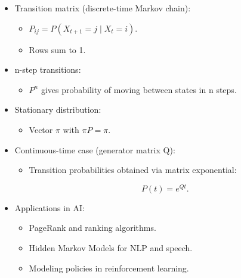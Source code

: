 \documentclass[
  letterpaper,
  DIV=11,
  numbers=noendperiod]{scrreprt}
\providecommand{\tightlist}{%
  \setlength{\itemsep}{0pt}\setlength{\parskip}{0pt}}
\begin{document}
\begin{itemize}
\item
  Transition matrix (discrete-time Markov chain):

  \begin{itemize}
  \tightlist
  \item
    \(P_{ij} = P(X_{t+1}=j \mid X_t=i)\).
  \item
    Rows sum to 1.
  \end{itemize}
\item
  n-step transitions:

  \begin{itemize}
  \tightlist
  \item
    \(P^n\) gives probability of moving between states in n steps.
  \end{itemize}
\item
  Stationary distribution:

  \begin{itemize}
  \tightlist
  \item
    Vector \(\pi\) with \(\pi P = \pi\).
  \end{itemize}
\item
  Continuous-time case (generator matrix Q):

  \begin{itemize}
  \item
    Transition probabilities obtained via matrix exponential:

    \[
    P(t) = e^{Qt}.
    \]
  \end{itemize}
\item
  Applications in AI:

  \begin{itemize}
  \tightlist
  \item
    PageRank and ranking algorithms.
  \item
    Hidden Markov Models for NLP and speech.
  \item
    Modeling policies in reinforcement learning.
  \end{itemize}
\end{itemize}
\end{document}

